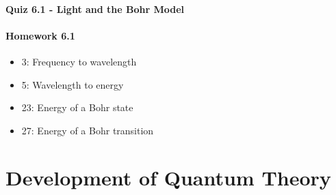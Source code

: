\documentclass[12pt, openany, letterpaper]{memoir}
\begin{document}
\paragraph*{Quiz 6.1 - Light and the Bohr Model}
\paragraph*{Homework 6.1}
\begin{itemize}
  \item 3: Frequency to wavelength
  \item 5: Wavelength to energy
  \item 23: Energy of a Bohr state
  \item 27: Energy of a Bohr transition
\end{itemize}

\section{Development of Quantum Theory}
\end{document}
